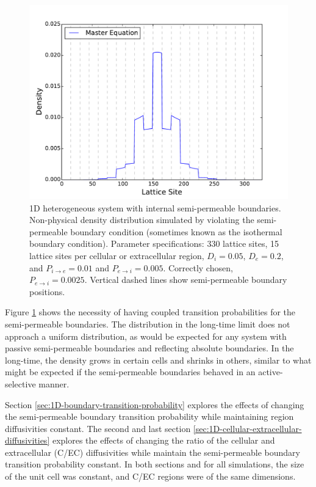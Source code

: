	\begin{figure}[h]
		\centering
		\includegraphics[width=1.0\linewidth]{../images/1D/11U_heterogeneous_plots_1D_nonphysical}
		\caption{1D heterogeneous system with internal semi-permeable boundaries. Non-physical density distribution simulated by violating the semi-permeable boundary condition (sometimes known as the isothermal boundary condition). Parameter specifications: 330 lattice sites, 15 lattice sites per cellular or extracellular region, $ D_i = 0.05 $, $ D_e = 0.2 $, and $ P_{i\rightarrow e} = 0.01 $ and $ P_{e\rightarrow i} =  0.005 $. Correctly chosen, $ P_{e\rightarrow i} =  0.0025 $. Vertical dashed lines show semi-permeable boundary positions. }
		\label{fig:11U_heterogeneous_plots_1D_nonphysical}
	\end{figure}
	
	\newpage
	Figure \ref{fig:11U_heterogeneous_plots_1D_nonphysical} shows the necessity of having coupled transition probabilities for the semi-permeable boundaries. The distribution in the long-time limit does not approach a uniform distribution, as would be expected for any system with passive semi-permeable boundaries and reflecting absolute boundaries. In the long-time, the density grows in certain cells and shrinks in others, similar to what might be expected if the semi-permeable boundaries behaved in an active-selective manner. 
	
	\newpage
	Section \ref{sec:1D-boundary-transition-probability} explores the effects of changing the semi-permeable boundary transition probability while maintaining region diffusivities constant. The second and last section \ref{sec:1D-cellular-extracellular-diffusivities} explores the effects of changing the ratio of the cellular and extracellular (C/EC) diffusivities while maintain the semi-permeable boundary transition probability constant. In both sections and for all simulations, the size of the unit cell was constant, and C/EC regions were of the same dimensions.
	
